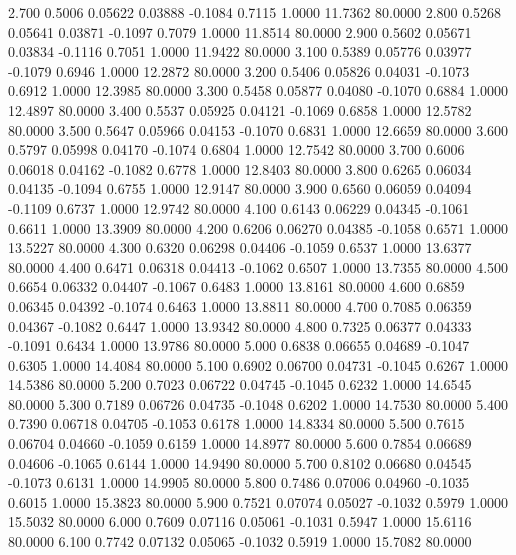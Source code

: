    2.700   0.5006   0.05622   0.03888  -0.1084   0.7115   1.0000  11.7362  80.0000
   2.800   0.5268   0.05641   0.03871  -0.1097   0.7079   1.0000  11.8514  80.0000
   2.900   0.5602   0.05671   0.03834  -0.1116   0.7051   1.0000  11.9422  80.0000
   3.100   0.5389   0.05776   0.03977  -0.1079   0.6946   1.0000  12.2872  80.0000
   3.200   0.5406   0.05826   0.04031  -0.1073   0.6912   1.0000  12.3985  80.0000
   3.300   0.5458   0.05877   0.04080  -0.1070   0.6884   1.0000  12.4897  80.0000
   3.400   0.5537   0.05925   0.04121  -0.1069   0.6858   1.0000  12.5782  80.0000
   3.500   0.5647   0.05966   0.04153  -0.1070   0.6831   1.0000  12.6659  80.0000
   3.600   0.5797   0.05998   0.04170  -0.1074   0.6804   1.0000  12.7542  80.0000
   3.700   0.6006   0.06018   0.04162  -0.1082   0.6778   1.0000  12.8403  80.0000
   3.800   0.6265   0.06034   0.04135  -0.1094   0.6755   1.0000  12.9147  80.0000
   3.900   0.6560   0.06059   0.04094  -0.1109   0.6737   1.0000  12.9742  80.0000
   4.100   0.6143   0.06229   0.04345  -0.1061   0.6611   1.0000  13.3909  80.0000
   4.200   0.6206   0.06270   0.04385  -0.1058   0.6571   1.0000  13.5227  80.0000
   4.300   0.6320   0.06298   0.04406  -0.1059   0.6537   1.0000  13.6377  80.0000
   4.400   0.6471   0.06318   0.04413  -0.1062   0.6507   1.0000  13.7355  80.0000
   4.500   0.6654   0.06332   0.04407  -0.1067   0.6483   1.0000  13.8161  80.0000
   4.600   0.6859   0.06345   0.04392  -0.1074   0.6463   1.0000  13.8811  80.0000
   4.700   0.7085   0.06359   0.04367  -0.1082   0.6447   1.0000  13.9342  80.0000
   4.800   0.7325   0.06377   0.04333  -0.1091   0.6434   1.0000  13.9786  80.0000
   5.000   0.6838   0.06655   0.04689  -0.1047   0.6305   1.0000  14.4084  80.0000
   5.100   0.6902   0.06700   0.04731  -0.1045   0.6267   1.0000  14.5386  80.0000
   5.200   0.7023   0.06722   0.04745  -0.1045   0.6232   1.0000  14.6545  80.0000
   5.300   0.7189   0.06726   0.04735  -0.1048   0.6202   1.0000  14.7530  80.0000
   5.400   0.7390   0.06718   0.04705  -0.1053   0.6178   1.0000  14.8334  80.0000
   5.500   0.7615   0.06704   0.04660  -0.1059   0.6159   1.0000  14.8977  80.0000
   5.600   0.7854   0.06689   0.04606  -0.1065   0.6144   1.0000  14.9490  80.0000
   5.700   0.8102   0.06680   0.04545  -0.1073   0.6131   1.0000  14.9905  80.0000
   5.800   0.7486   0.07006   0.04960  -0.1035   0.6015   1.0000  15.3823  80.0000
   5.900   0.7521   0.07074   0.05027  -0.1032   0.5979   1.0000  15.5032  80.0000
   6.000   0.7609   0.07116   0.05061  -0.1031   0.5947   1.0000  15.6116  80.0000
   6.100   0.7742   0.07132   0.05065  -0.1032   0.5919   1.0000  15.7082  80.0000
